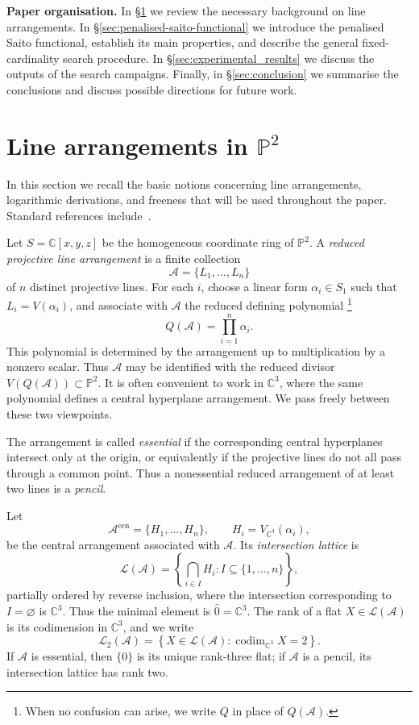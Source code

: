 \documentclass[pdflatex,sn-mathphys-num]{sn-jnl}%
\theoremstyle{remark}
\theoremstyle{definition}
\begin{document}
\medskip

\noindent\textbf{Paper organisation.}
In \S\ref{sec:preliminaries-arrangements} we review the necessary background on line arrangements. In \S\ref{sec:penalised-saito-functional} we introduce the penalised Saito functional, establish its main properties, and describe the general fixed-cardinality search procedure. In \S\ref{sec:experimental_results} we discuss the outputs of the search campaigns. Finally, in \S\ref{sec:conclusion} we summarise the conclusions and discuss possible directions for future work.


\section{Line arrangements in \texorpdfstring{$\mathbb{P}^2$}{P2}}
\label{sec:preliminaries-arrangements}

In this section we recall the basic notions concerning line arrangements, logarithmic derivations, and freeness that will be used throughout the paper. Standard references include~\cite{Orlik1992,Dimca2017,Yoshinaga2014}.

Let $S=\mathbb C[x,y,z]$ be the homogeneous coordinate ring of $\mathbb P^2$. A \emph{reduced projective line arrangement} is a finite collection
\[
\mathcal{A}=\{L_1,\ldots,L_n\}
\]
of $n$ distinct projective lines. For each $i$, choose a linear form
$\alpha_i\in S_1$ such that $L_i=V(\alpha_i)$, and associate with
$\mathcal{A}$ the reduced defining polynomial
\footnote{When no confusion can arise, we write $Q$ in place of
$Q(\mathcal{A})$.}
\[
Q(\mathcal{A})=\prod_{i=1}^n\alpha_i.
\]
This polynomial is determined by the arrangement up to multiplication by a nonzero scalar. Thus $\mathcal{A}$ may be identified with the reduced divisor $V(Q(\mathcal{A}))\subset\mathbb P^2$. It is often convenient to work in $\mathbb C^3$, where the same polynomial defines a central hyperplane arrangement. We pass freely between these two viewpoints.

The arrangement is called \emph{essential} if the corresponding central hyperplanes intersect only at the origin, or equivalently if the projective lines do not all pass through a common point. Thus a nonessential reduced arrangement of at least two lines is a \emph{pencil}.

Let
\[
\mathcal{A}^{\mathrm{cen}}
=
\{H_1,\ldots,H_n\},
\qquad
H_i=V_{\mathbb C^3}(\alpha_i),
\]
be the central arrangement associated with $\mathcal{A}$. Its
\emph{intersection lattice} is
\[
\mathcal L(\mathcal{A})
=
\left\{
\bigcap_{i\in I}H_i:
I\subseteq\{1,\ldots,n\}
\right\},
\]
partially ordered by reverse inclusion, where the intersection corresponding to $I=\varnothing$ is $\mathbb C^3$. Thus the minimal element is $\hat 0=\mathbb C^3$. The rank of a flat $X\in\mathcal L(\mathcal{A})$ is its codimension in $\mathbb C^3$, and we write
\[
\mathcal{L}_2(\mathcal{A})
=
\left\{
X\in\mathcal L(\mathcal{A}):
\operatorname{codim}_{\mathbb C^3}X=2
\right\}.
\]
If $\mathcal{A}$ is essential, then $\{0\}$ is its unique rank-three flat; if $\mathcal{A}$ is a pencil, its intersection lattice has rank two.
\end{document}
